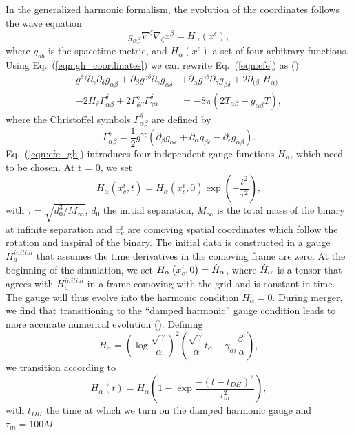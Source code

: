 In the generalized harmonic formalism, the evolution of the coordinates follows the wave equation
%
\begin{equation}
  \label{eqn:gh_coordinates}
   g_{\alpha\beta}\nabla^\zeta\nabla_\zeta x^\beta = H_\alpha\left(x^\epsilon\right),
\end{equation}
%
where $ g_{ab}$ is the spacetime metric, and $H_\alpha(x^c)$ a set of four arbitrary functions. Using Eq.~(\ref{eqn:gh_coordinates}) we can rewrite 
Eq.~(\ref{eqn:efe}) as (\citet*{pretorius2005numerical})
%
\begin{equation}
  \begin{split}
  \label{eqn:efe_gh}
   g^{\delta\gamma}\partial_\gamma\partial_\delta g_{\alpha\beta} + \partial_\beta g^{\gamma\delta}\partial_\gamma g_{\alpha\delta} &+ \partial_\alpha g^{\gamma\delta}\partial_\gamma g_{\beta\delta} + 2\partial_{(\beta,} H_{\alpha)} \\
  - 2H_\delta\Gamma^\delta_{\alpha\beta} + 2\Gamma^\gamma_{\delta\beta}\Gamma^{\delta}_{\gamma\alpha} &= -8\pi(2T_{\alpha\beta} - g_{\alpha\beta}T),
  \end{split}
\end{equation}
%
where the Christoffel symbols $\Gamma^\delta_{\alpha\beta}$ are defined by
%
\begin{equation}
\Gamma^\gamma_{\alpha\beta} = \frac{1}{2} g^{\gamma\epsilon}\left(\partial_\beta g_{\alpha\epsilon} + \partial_\alpha g_{\beta\epsilon} - \partial_\epsilon g_{\alpha\beta}\right).
\end{equation}
%
Eq.~(\ref{eqn:efe_gh}) introduces four independent gauge functions $H_\alpha$, which need to be chosen. At t = 0, we set
%
\begin{equation}
H_\alpha\left(x^i_c,t\right) = H_\alpha\left(x^i_c,0\right)\exp\left(-\frac{t^2}{\tau^2}\right),
\end{equation}
%
with $\tau = \sqrt{d^3_0/M_\infty}$, $d_0$ the initial separation, $M_\infty$ is the total mass of the binary at infinite separation and $x^i_c$ are comoving spatial coordinates which follow the rotation and inspiral of the binary. The initial data is constructed in a gauge $H^{initial}_a$ that assumes the time derivatives in the comoving frame are zero. At the beginning of the simulation, we set $H_\alpha\left(x^i_c,0\right) = \Hat H_\alpha$, where $\Hat H_\alpha$ is a tensor that agrees with $H^{initial}_a$ in a frame comoving with the grid and is constant in time. The gauge will thus evolve into the harmonic condition $H_\alpha = 0$. During merger, we find that transitioning to the ``damped harmonic'' gauge condition leads to more accurate numerical evolution (\citet*{szilagyi2014key}). Defining
%
\begin{equation}
  H_\alpha = \left(\log{\frac{\sqrt{\gamma}}{\alpha}}\right)^2\left(\frac{\sqrt{\gamma}}{\alpha}t_\alpha - \gamma_{\alpha i} \frac{\beta^i}{\alpha}\right),
\end{equation}
%
we transition according to
%
\begin{equation}
  H_\alpha(t) = H_\alpha\left(1-\exp{\frac{-(t-t_{DH})^2}{\tau_{m}^2}}\right),
\end{equation}
%
with $t_{DH}$ the time at which we turn on the damped harmonic gauge and $\tau_m = 100M$.

